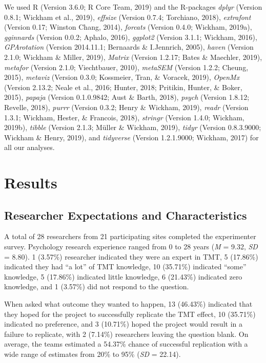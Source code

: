\documentclass[man]{apa6}
\begin{document}
We used R (Version 3.6.0; R Core Team, 2019) and the R-packages \emph{dplyr} (Version 0.8.1; Wickham et al., 2019), \emph{effsize} (Version 0.7.4; Torchiano, 2018), \emph{extrafont} (Version 0.17; Winston Chang, 2014), \emph{forcats} (Version 0.4.0; Wickham, 2019a), \emph{gginnards} (Version 0.0.2; Aphalo, 2016), \emph{ggplot2} (Version 3.1.1; Wickham, 2016), \emph{GPArotation} (Version 2014.11.1; Bernaards \& I.Jennrich, 2005), \emph{haven} (Version 2.1.0; Wickham \& Miller, 2019), \emph{Matrix} (Version 1.2.17; Bates \& Maechler, 2019), \emph{metafor} (Version 2.1.0; Viechtbauer, 2010), \emph{metaSEM} (Version 1.2.2; Cheung, 2015), \emph{metaviz} (Version 0.3.0; Kossmeier, Tran, \& Voracek, 2019), \emph{OpenMx} (Version 2.13.2; Neale et al., 2016; Hunter, 2018; Pritikin, Hunter, \& Boker, 2015), \emph{papaja} (Version 0.1.0.9842; Aust \& Barth, 2018), \emph{psych} (Version 1.8.12; Revelle, 2018), \emph{purrr} (Version 0.3.2; Henry \& Wickham, 2019), \emph{readr} (Version 1.3.1; Wickham, Hester, \& Francois, 2018), \emph{stringr} (Version 1.4.0; Wickham, 2019b), \emph{tibble} (Version 2.1.3; Müller \& Wickham, 2019), \emph{tidyr} (Version 0.8.3.9000; Wickham \& Henry, 2019), and \emph{tidyverse} (Version 1.2.1.9000; Wickham, 2017) for all our analyses.

\hypertarget{results}{%
\section{Results}\label{results}}

\hypertarget{researcher-expectations-and-characteristics}{%
\subsection{Researcher Expectations and Characteristics}\label{researcher-expectations-and-characteristics}}

A total of 28 researchers from 21 participating sites completed the experimenter survey. Psychology research experience ranged from 0 to 28 years (\emph{M} = 9.32, \emph{SD} = 8.80). 1 (3.57\%) researcher indicated they were an expert in TMT, 5 (17.86\%) indicated they had \enquote{a lot} of TMT knowledge, 10 (35.71\%) indicated \enquote{some} knowledge, 5 (17.86\%) indicated little knowledge, 6 (21.43\%) indicated zero knowledge, and 1 (3.57\%) did not respond to the question.

When asked what outcome they wanted to happen, 13 (46.43\%) indicated that they hoped for the project to successfully replicate the TMT effect, 10 (35.71\%) indicated no preference, and 3 (10.71\%) hoped the project would result in a failure to replicate, with 2 (7.14\%) researchers leaving the question blank. On average, the teams estimated a 54.37\% chance of successful replication with a wide range of estimates from 20\% to 95\% (\emph{SD} = 22.14).
\end{document}
